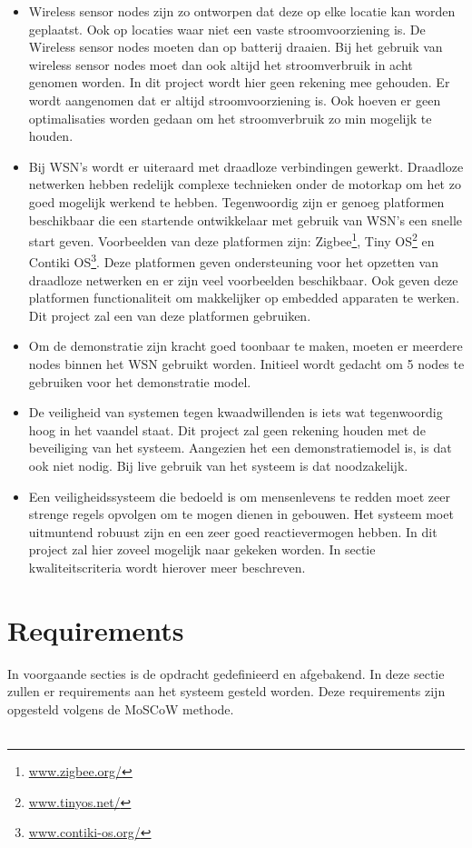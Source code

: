 \documentclass{../local}
\begin{document}
\begin{itemize}
\item Wireless sensor nodes zijn zo ontworpen dat deze op elke locatie kan worden geplaatst. Ook op locaties waar niet een vaste stroomvoorziening is. De Wireless sensor nodes moeten dan op batterij draaien. Bij het gebruik van wireless sensor nodes moet dan ook altijd het stroomverbruik in acht genomen worden. In dit project wordt hier geen rekening mee gehouden. Er wordt aangenomen dat er altijd stroomvoorziening is. Ook hoeven er geen optimalisaties worden gedaan om het stroomverbruik zo min mogelijk te houden.
\item Bij WSN's wordt er uiteraard met draadloze verbindingen gewerkt. Draadloze netwerken hebben redelijk complexe technieken onder de motorkap om het zo goed mogelijk werkend te hebben. Tegenwoordig zijn er genoeg platformen beschikbaar die een startende ontwikkelaar met gebruik van WSN's een snelle start geven. Voorbeelden van deze platformen zijn: Zigbee\footnote{\url{www.zigbee.org/}}, Tiny OS\footnote{\url{www.tinyos.net/}} en Contiki OS\footnote{\url{www.contiki-os.org/}}. Deze platformen geven ondersteuning voor het opzetten van draadloze netwerken en er zijn veel voorbeelden beschikbaar. Ook geven deze platformen functionaliteit om makkelijker op embedded apparaten te werken. Dit project zal een van deze platformen gebruiken. 
\item Om de demonstratie zijn kracht goed toonbaar te maken, moeten er meerdere nodes binnen het WSN gebruikt worden. Initieel wordt gedacht om 5 nodes te gebruiken voor het demonstratie model.
\item De veiligheid van systemen tegen kwaadwillenden is iets wat tegenwoordig hoog in het vaandel staat. Dit project zal geen rekening houden met de beveiliging van het systeem. Aangezien het een demonstratiemodel is, is dat ook niet nodig. Bij live gebruik van het systeem is dat noodzakelijk.
\item Een veiligheidssysteem die bedoeld is om mensenlevens te redden moet zeer strenge regels opvolgen om te mogen dienen in gebouwen. Het systeem moet uitmuntend robuust zijn en een zeer goed reactievermogen hebben. In dit project zal hier zoveel mogelijk naar gekeken worden. In sectie kwaliteitscriteria wordt hierover meer beschreven.
\end{itemize}

\section{Requirements}
In voorgaande secties is de opdracht gedefinieerd en afgebakend. In deze sectie zullen er requirements aan het systeem gesteld worden. Deze requirements zijn opgesteld volgens de MoSCoW methode. 
\\\\
\end{document}
